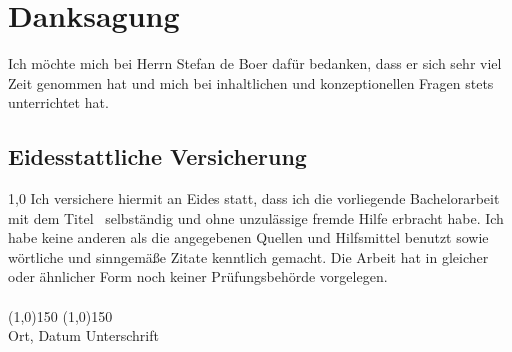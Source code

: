 \thispagestyle{empty}
\section*{Danksagung}
Ich möchte mich bei Herrn Stefan de Boer dafür bedanken, dass er sich sehr viel Zeit genommen hat und mich bei inhaltlichen und konzeptionellen Fragen stets
unterrichtet hat.
\newpage
\thispagestyle{empty}
\begin{center}
\section*{Eidesstattliche Versicherung}
\end{center}
\begin{spacing}{1,0}
\noindent
Ich versichere hiermit an Eides statt, dass ich die vorliegende Bachelorarbeit mit dem Titel \grqq \ selbst\"andig und ohne unzulässige fremde Hilfe erbracht habe. Ich habe keine anderen als die angegebenen
Quellen und Hilfsmittel benutzt sowie w\"ortliche und sinngem\"a\ss e Zitate kenntlich gemacht.
Die Arbeit hat in gleicher oder \"ahnlicher Form noch keiner Pr\"ufungsbeh\"orde vorgelegen.
\vspace*{1cm}
\ \\
\ \\
\line(1,0){150} \hfill \line(1,0){150}\\
Ort, Datum \hfill Unterschrift \hspace*{3cm}
\vspace*{1.5cm}


\end{spacing}

